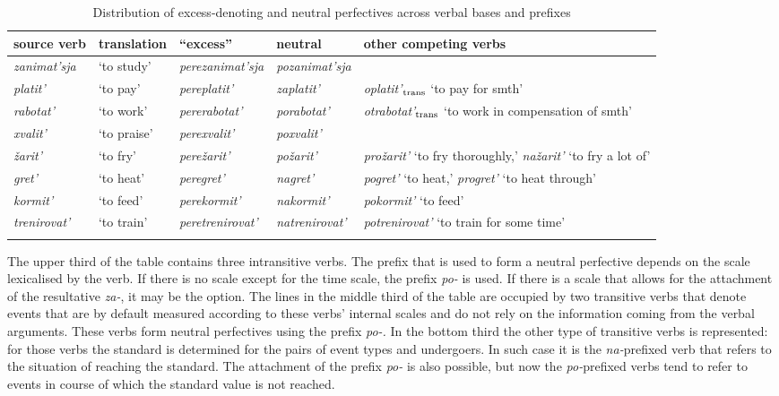 \begin{sidewaystable}
\caption{Distribution of excess-denoting and neutral perfectives across verbal bases and prefixes \label{table:competition}}
\begin{tabularx}{\textwidth}{l  l  l  l  Q}
\lsptoprule
source verb& translation & ``excess'' & neutral & other competing verbs\\ \midrule
\textit{zanimat'sja} & `to study' & \textit{perezanimat'sja} & \textit{pozanimat'sja} & \\
\textit{platit'} & `to pay' & \textit{pereplatit'} & \textit{zaplatit'} & \textit{oplatit'$_{\text{\normalfont trans}}$} `to pay for smth'\\
\textit{rabotat'} & `to work' & \textit{pererabotat'} & \textit{porabotat'} & \textit{otrabotat'$_{\text{\normalfont trans}}$} `to work in compensation of smth'\\

\tablevspace
\textit{xvalit'} & `to praise' & \textit{perexvalit'} & \textit{poxvalit'} &\\
\textit{\v{z}arit'} & `to fry' & \textit{pere\v{z}arit'} & \textit{po\v{z}arit'} & \textit{pro\v{z}arit'} `to fry thoroughly,' \textit{na\v{z}arit'} `to fry a lot of'\\ 

\tablevspace
\textit{gret'} & `to heat' & \textit{peregret'} & \textit{nagret'} & \textit{pogret'} `to heat,' \textit{progret'} `to heat through'\\ 
\textit{kormit'} & `to feed' & \textit{perekormit'} & \textit{nakormit'} & \textit{pokormit'} `to feed'\\
\textit{trenirovat'} & `to train' & \textit{peretrenirovat'} & \textit{natrenirovat'} & \textit{potrenirovat'} `to train for some time'\\\lspbottomrule
\end{tabularx}
\end{sidewaystable}

The upper third of the table contains three intransitive verbs. The prefix that is used to form a neutral perfective depends on the scale lexicalised by the verb. If there is no scale except for the time scale, the prefix \textit{po-} is used. If there is a scale that allows for the attachment of the resultative \textit{za-}, it may be the option. The lines in the middle third of the table are occupied by two transitive verbs that denote events that are by default measured according to these verbs' internal scales and do not rely on the information coming from the verbal arguments. These verbs form neutral perfectives using the prefix \textit{po-.} In the bottom third the other type of transitive verbs is represented: for those verbs the standard is determined for the pairs of event types and undergoers. In such case it is the \textit{na-}prefixed verb that refers to the situation of reaching the standard. The attachment of the prefix \textit{po-} is also possible, but now the \textit{po-}prefixed verbs tend to refer to events in course of which the standard value is not reached.

